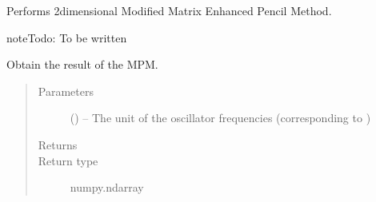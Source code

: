 \documentclass[letterpaper,10pt,english]{sphinxmanual}
\begin{document}
\begin{fulllineitems}
\begin{fulllineitems}
\end{fulllineitems}


\begin{fulllineitems}
\label{\detokenize{references/mpm:nmrespy.mpm.MatrixPencil._mpm_2d}}
\sphinxAtStartPar
Performs 2\sphinxhyphen{}dimensional Modified Matrix Enhanced Pencil Method.

\begin{sphinxadmonition}{note}{\label{\detokenize{references/mpm:id11}}Todo:}
\sphinxAtStartPar
To be written
\end{sphinxadmonition}

\end{fulllineitems}


\begin{fulllineitems}
\label{\detokenize{references/mpm:nmrespy.mpm.MatrixPencil.get_result}}
\sphinxAtStartPar
Obtain the result of the MPM.
\begin{quote}\begin{description}
\item[{Parameters}] \leavevmode
\sphinxAtStartPar
{} (\sphinxstyleliteralemphasis{\sphinxupquote{, }}) – The unit of the oscillator frequencies (corresponding to
)

\item[{Returns}] \leavevmode
\sphinxAtStartPar
{}

\item[{Return type}] \leavevmode
\sphinxAtStartPar
numpy.ndarray

\end{description}\end{quote}

\end{fulllineitems}


\end{fulllineitems}
\end{document}
